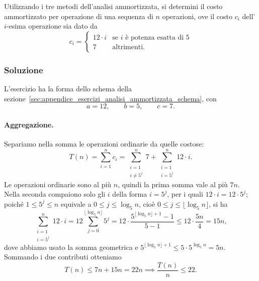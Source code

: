 \begin{esercizio}\label{es:appendice_ammortizzata_potenze_5}
Utilizzando i tre metodi dell'analisi ammortizzata, si determini il costo ammortizzato per operazione di una sequenza di $n$ operazioni, ove il costo $c_i$ dell'$i$-esima operazione sia dato da
\[
c_i =
\begin{cases}
    12 \cdot i & \text{se } i \text{ è potenza esatta di } 5 \\
    7 & \text{altrimenti.}
\end{cases}
\]
\end{esercizio}

\subsubsection*{Soluzione}
L'esercizio ha la forma dello schema della sezione~\ref{sec:appendice_esercizi_analisi_ammortizzata_schema}, con
\[
a = 12, \qquad b = 5, \qquad c = 7.
\]

\paragraph{Aggregazione.}
Separiamo nella somma le operazioni ordinarie da quelle costose:
\[
T(n) = \sum_{i=1}^{n} c_i = \sum_{\substack{i=1 \\ i \ne 5^j}}^{n} 7 + \sum_{\substack{i=1 \\ i = 5^j}}^{n} 12 \cdot i .
\]
Le operazioni ordinarie sono al più $n$, quindi la prima somma vale al più $7n$. Nella seconda compaiono solo gli $i$ della forma $i = 5^j$, per i quali $12 \cdot i = 12 \cdot 5^j$; poiché $1 \le 5^j \le n$ equivale a $0 \le j \le \log_5 n$, cioè $0 \le j \le \lfloor \log_5 n \rfloor$, si ha
\[
\sum_{\substack{i=1 \\ i = 5^j}}^{n} 12 \cdot i = 12 \sum_{j=0}^{\lfloor \log_5 n \rfloor} 5^j = 12 \cdot \frac{5^{\lfloor \log_5 n \rfloor + 1} - 1}{5 - 1} \le 12 \cdot \frac{5n}{4} = 15n,
\]
dove abbiamo usato la somma geometrica e $5^{\lfloor \log_5 n \rfloor + 1} \le 5 \cdot 5^{\log_5 n} = 5n$. Sommando i due contributi otteniamo
\[
T(n) \le 7n + 15n = 22n \implies \frac{T(n)}{n} \le 22 .
\]

